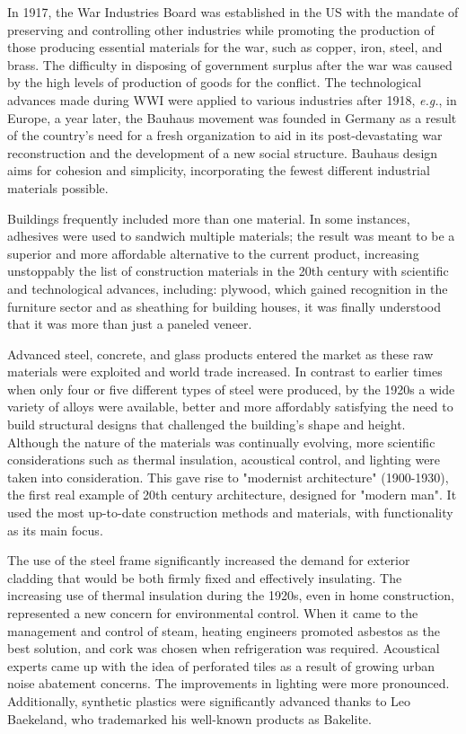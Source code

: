 In 1917, the War Industries Board was established in the US with the mandate of preserving and controlling other industries while promoting the production of those producing essential materials for the war, such as copper, iron, steel, and brass. The difficulty in disposing of government surplus after the war was caused by the high levels of production of goods for the conflict.\autocite{united1921american}  The technological advances made during WWI were applied to various industries after 1918, \textit{e.g.}, in Europe, a year later, the Bauhaus movement was founded in Germany as a result of the country's need for a fresh organization to aid in its post-devastating war reconstruction and the development of a new social structure. Bauhaus design aims for cohesion and simplicity, incorporating the fewest different industrial materials possible.\autocite{griffith2000bauhaus}

Buildings frequently included more than one material. In some instances, adhesives were used to sandwich multiple materials; the result was meant to be a superior and more affordable alternative to the current product,\autocite{jester2014twentieth} increasing unstoppably the list of construction materials in the 20th century with scientific and technological advances,\autocite{laffarga1997resena} including: plywood, which gained recognition in the furniture sector and as sheathing for building houses, it was finally understood that it was more than just a paneled veneer.\autocite{jester2014twentieth}

Advanced steel, concrete, and glass products entered the market as these raw materials were exploited and world trade increased. In contrast to earlier times when only four or five different types of steel were produced,\autocite{jester2014twentieth} by the 1920s a wide variety of alloys were available, better and more affordably satisfying the need to build structural designs that challenged the building's shape and height. Although the nature of the materials was continually evolving, more scientific considerations such as thermal insulation, acoustical control, and lighting were taken into consideration.\autocite{bozsaky2010historical} This gave rise to "modernist architecture" (1900-1930), the first real example of 20th century architecture, designed for "modern man". It used the most up-to-date construction methods and materials, with functionality as its main focus.\autocite{sharp2002twentieth}

The use of the steel frame significantly increased the demand for exterior cladding that would be both firmly fixed and effectively insulating. The increasing use of thermal insulation during the 1920s, even in home construction, represented a new concern for environmental control. When it came to the management and control of steam, heating engineers promoted asbestos as the best solution, and cork was chosen when refrigeration was required. Acoustical experts came up with the idea of perforated tiles as a result of growing urban noise abatement concerns. The improvements in lighting were more pronounced. Additionally, synthetic plastics were significantly advanced thanks to Leo Baekeland, who trademarked his well-known products as Bakelite.\autocite{mercelis2020beyond}

